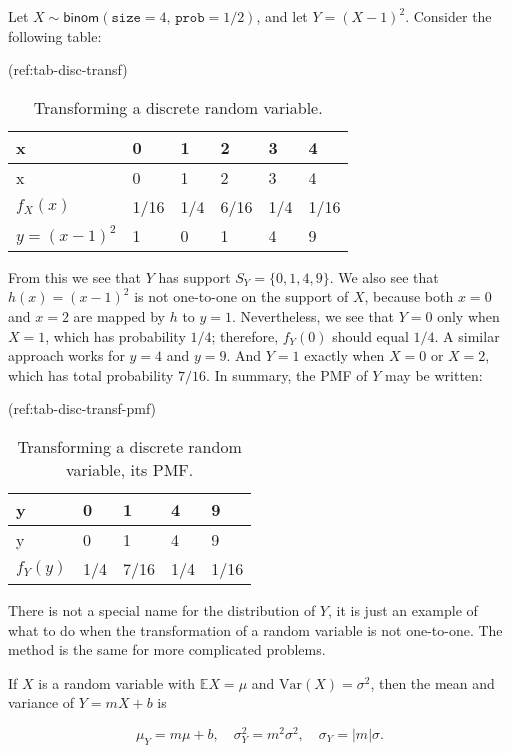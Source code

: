 \documentclass[]{book}
\numberwithin{equation}{chapter}
\numberwithin{figure}{chapter}
\theoremstyle{plain}
\theoremstyle{definition}
\theoremstyle{remark}
\theoremstyle{definition}
\theoremstyle{definition}
\theoremstyle{remark}
\let\BeginKnitrBlock\begin \let\EndKnitrBlock\end
\begin{document}
\bigskip

\BeginKnitrBlock{example}
\protect\hypertarget{ex:unnamed-chunk-248}{}{\label{ex:unnamed-chunk-248}}Let
\(X\sim\mathsf{binom}(\mathtt{size}=4,\,\mathtt{prob}=1/2)\), and let
\(Y=(X-1)^{2}\). Consider the following table:
\EndKnitrBlock{example}

(ref:tab-disc-transf)

\begin{longtable}[]{@{}llllll@{}}
\caption{Transforming a discrete random variable.}\tabularnewline
\toprule
x & 0 & 1 & 2 & 3 & 4\tabularnewline
\midrule
\endfirsthead
\toprule
x & 0 & 1 & 2 & 3 & 4\tabularnewline
\midrule
\endhead
\(f_{X}(x)\) & 1/16 & 1/4 & 6/16 & 1/4 & 1/16\tabularnewline
\(y=(x-1)^{2}\) & 1 & 0 & 1 & 4 & 9\tabularnewline
\bottomrule
\end{longtable}

From this we see that \(Y\) has support \(S_{Y}=\{0,1,4,9\}\). We also
see that \(h(x)=(x-1)^{2}\) is not one-to-one on the support of \(X\),
because both \(x=0\) and \(x=2\) are mapped by \(h\) to \(y=1\).
Nevertheless, we see that \(Y=0\) only when \(X=1\), which has
probability \(1/4\); therefore, \(f_{Y}(0)\) should equal \(1/4\). A
similar approach works for \(y=4\) and \(y=9\). And \(Y=1\) exactly when
\(X=0\) or \(X=2\), which has total probability \(7/16\). In summary,
the PMF of \(Y\) may be written:

(ref:tab-disc-transf-pmf)

\begin{longtable}[]{@{}lllll@{}}
\caption{Transforming a discrete random variable, its
PMF.}\tabularnewline
\toprule
y & 0 & 1 & 4 & 9\tabularnewline
\midrule
\endfirsthead
\toprule
y & 0 & 1 & 4 & 9\tabularnewline
\midrule
\endhead
\(f_{Y}(y)\) & 1/4 & 7/16 & 1/4 & 1/16\tabularnewline
\bottomrule
\end{longtable}

There is not a special name for the distribution of \(Y\), it is just an
example of what to do when the transformation of a random variable is
not one-to-one. The method is the same for more complicated problems.

\bigskip

\BeginKnitrBlock{proposition}
\protect\hypertarget{prp:unnamed-chunk-249}{}{\label{prp:unnamed-chunk-249}}If
\(X\) is a random variable with \(\mathbb{E} X=\mu\) and
\(\mbox{Var}(X)=\sigma^{2}\), then the mean and variance of \(Y=mX+b\)
is

\begin{equation}
\mu_{Y}=m\mu+b,\quad \sigma_{Y}^{2}=m^{2}\sigma^{2},\quad \sigma_{Y}=|m|\sigma.
\end{equation}
\EndKnitrBlock{proposition}
\end{document}
